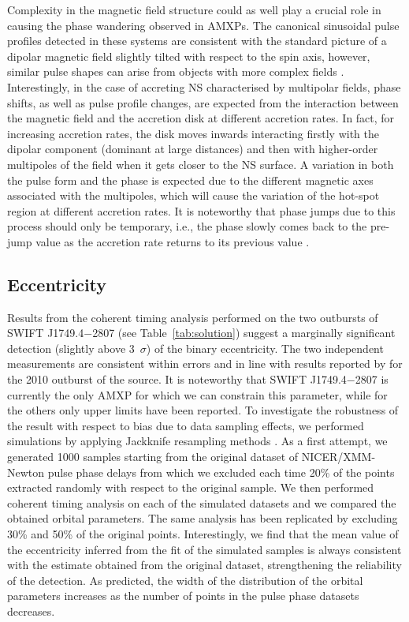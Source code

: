 \documentclass[fleqn,usenatbib]{mnras}
\newcommand{\swiftj}{SWIFT J1749.4$-$2807}
\newcommand{\nicer}{NICER}
\newcommand{\xmm}{XMM-Newton}
\begin{document}
Complexity in the magnetic field structure could as well play a crucial role in causing the phase wandering observed in AMXPs. The canonical sinusoidal pulse profiles detected in these systems are consistent with the standard picture of a dipolar magnetic field slightly tilted with respect to the spin axis, however, similar pulse shapes can arise from objects with more complex fields \citep[see e.g.,][]{Long:2008vb}. Interestingly, in the case of accreting NS characterised by multipolar fields, phase shifts, as well as pulse profile changes, are expected from the interaction between the magnetic field and the accretion disk at different accretion rates. In fact, for increasing accretion rates, the disk moves inwards interacting firstly with the dipolar component (dominant at large distances) and then with higher-order multipoles of the field when it gets closer to the NS surface. A variation in both the pulse form and the phase is expected due to the different magnetic axes associated with the multipoles, which will cause the variation of the hot-spot region at different accretion rates. It is noteworthy that phase jumps due to this process should only be temporary, i.e., the phase slowly comes back to the pre-jump value as the accretion rate returns to its previous value \citep{Long2012}.



\subsection{Eccentricity}
\label{sec:ecc}
Results from the coherent timing analysis performed on the two outbursts of \swiftj{} (see Table~\ref{tab:solution}) suggest a marginally significant detection (slightly above 3~$\sigma$) of the binary eccentricity. The two independent measurements are consistent within errors and in line with results reported by \citet{Markwardt:2010tl} for the 2010 outburst of the source. It is noteworthy that \swiftj{} is currently the only AMXP for which we can constrain this parameter, while for the others only upper limits have been reported.  
To investigate the robustness of the result with respect to bias due to data sampling effects, we performed simulations by applying Jackknife resampling methods \citep[see e.g.,][]{Shao1995}. As a first attempt, we generated 1000 samples starting from the original dataset of \nicer{}/\xmm{} pulse phase delays from which we excluded each time 20\% of the points extracted randomly with respect to the original sample. We then performed coherent timing analysis on each of the simulated datasets and we compared the obtained orbital parameters. The same analysis has been replicated by excluding 30\% and 50\% of the original points. Interestingly, we find that the mean value of the eccentricity inferred from the fit of the simulated samples is always consistent with the estimate obtained from the original dataset, strengthening the reliability of the detection. As predicted, the width of the distribution of the orbital parameters increases as the number of points in the pulse phase datasets decreases. 
\end{document}
